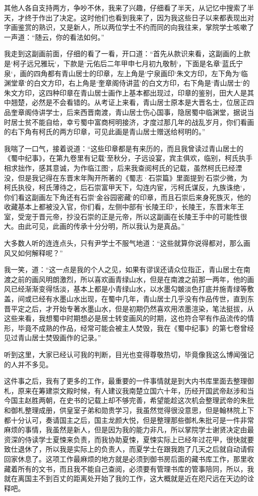 其他人各自支持两方，争吵不休，我来了兴趣，仔细看了半天，从记忆中搜索了半天，才终于作出了决定。这时他们也看到我来了，因为我这些日子以来都表现出对字画鉴赏的熟识，又是新人，所以两位学士不约而同的向我往来，掌院学士咳嗽了一声道：“随云，你的看法如何。”

我走到这副画前面，仔细的看了一看，开口道：“首先从款识来看，这副画的上款是‘柯子远兄雅玩‘，下款是‘元佑后二年甲申七月初九敬制‘，下面是名章‘蓝氏宁泉‘，画的四角都有青山居士的印章，左上角是‘宁泉画印‘朱文方印，左下角为‘临渊堂章‘的白文方印，右上角是‘奎章阁侍讲蓝‘的白文方印，右下角是‘青山居士‘的朱文方印，这四种印章在青山居士画作上基本都出现过，印章的鉴别，田大人是其中翘楚，必然是不会看错的。从考证上来看，青山居士原本是大晋名士，位居正四品奎章阁侍讲学士，后来西晋南渡，青山居士伤心国事，隐居蜀中临渊堂，据说当时居士贫不能自给，幸亏蜀中富商柯明接济，才度过那几年的战乱岁月，你们看画的右下角有柯氏的两方印章，可见此画是青山居士赠送给柯明的。”

我喘了一口气，接着说道：“这些印章都是有来历的，而且我曾读过青山居士的《蜀中纪事》，在第九卷里有记载‘至秋分，子远设宴，宾主俱欢，临别，柯氏执手相求拙作，感其意诚，为作临江图‘，后来我查阅柯氏的记载，虽然柯氏已经湮没，但是我记得在东晋末年陶开所著的《蜀志·石崇篇》里面提到‘石崇少微，为柯氏执役，柯氏薄待之，后石崇富甲天下，勾连内宦，污柯氏谋反，九族诛绝‘，你们看这副画左下角还有石崇‘金谷园密藏‘的印章，而且石崇后来身死族灭，他的收藏基本上都被没入官，你们看，左侧中部有‘长陵王印‘，长陵王，东晋末年王室，受宠于晋元帝，抄没石崇的正是元帝，所以这副画在长陵王手中的可能性很大。由此可见，此画的传承十分分明，所以我认为是真品。”

大多数人听的连连点头，只有尹学士不服气地道：“这些就算你说得都对，那么画风又如何解释呢？”

我一笑，道：“这一点是我的个人之见，如果有谬误还请众位指正，青山居士在南渡之前的画风明朗激烈，所以喜欢画青绿山水，但是在南渡之前那一两年，他的画风已经渐渐变得恬淡，基本上都是小青绿山水，以水墨勾皴淡色打底并施青绿等敷盖，间或已经有水墨山水出现，在蜀中几年，青山居士几乎没有作品传世，直到东晋平定之后，才开始专著水墨山水，但是初期仍然喜欢用浓墨渲染，笔法挺拔，从这些来看，我想蜀中时期想必是居士转变画风的时期，这也符合罕有作品流传的情形，毕竟不成熟的作品，经常可能会被主人焚毁，我在《蜀中纪事》的第七卷曾经见过青山居士焚毁画作的记录。”

听到这里，大家已经认可我的判断，目光也变得尊敬热切，毕竟像我这么博闻强记的人并不多见。

这件事之后，我有了更多的工作，最重要的一件事情就是到大内书库里面去整理御札，原来在筹建崇文殿时候，有人建议我南楚立国六十年，历经开国武帝赵涉和当今国主赵胜两朝，在史书的记载上却不够完善，希望能趁这次机会整理武帝的朱批和御札整理成册，供皇室子弟和勋贵学习，我虽然觉得很没意思，但是翰林院上下都十分认可，奏请国主之后，国主龙颜大悦，但是整理那些御札朱批可是一件非常麻烦的事情，我虽然是新人，但是因为我的能力非凡，所以掌院学士谢贤决定由最资深的侍读学士夏悚来负责，而我协助夏悚，夏悚实际上已经年过花甲，很快就要致仕退休了，所以我是实际上的负责人，而夏学士在跟我跑了几天之后就自动请假回家休息了。这项工作最麻烦的地方就是必须到御书房后面的藏书库工作，那里收藏着所有的文书，而且我不能自己查阅，必须要有管理书库的管事陪同，所以，我就在离国主不到百丈的距离处开始了我的工作，这大概就是近在咫尺远在天边的诠释吧。

